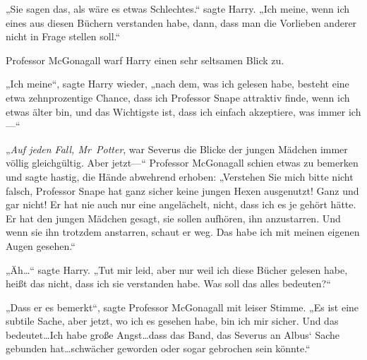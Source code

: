 „Sie sagen das, als wäre es etwas Schlechtes.“ sagte Harry. „Ich meine, wenn ich eines aus diesen Büchern verstanden habe, dann, dass man die Vorlieben anderer nicht in Frage stellen soll.“

Professor McGonagall warf Harry einen sehr seltsamen Blick zu.

„Ich meine“, sagte Harry wieder, „nach dem, was ich gelesen habe, besteht eine etwa zehnprozentige Chance, dass ich Professor Snape attraktiv finde, wenn ich etwas älter bin, und das Wichtigste ist, dass ich einfach akzeptiere, was immer ich—“

„\emph{Auf jeden Fall, Mr~Potter}, war Severus die Blicke der jungen Mädchen immer völlig gleichgültig. Aber jetzt—“ Professor McGonagall schien etwas zu bemerken und sagte hastig, die Hände abwehrend erhoben: „Verstehen Sie mich bitte nicht falsch, Professor Snape hat ganz sicher keine jungen Hexen ausgenutzt! Ganz und gar nicht! Er hat nie auch nur eine angelächelt, nicht, dass ich es je gehört hätte. Er hat den jungen Mädchen gesagt, sie sollen aufhören, ihn anzustarren. Und wenn sie ihn trotzdem anstarren, schaut er weg. Das habe ich mit meinen eigenen Augen gesehen.“

„Äh…“ sagte Harry. „Tut mir leid, aber nur weil ich diese Bücher gelesen habe, heißt das nicht, dass ich sie verstanden habe. Was soll das alles bedeuten?“

„Dass er es bemerkt“, sagte Professor McGonagall mit leiser Stimme. „Es ist eine subtile Sache, aber jetzt, wo ich es gesehen habe, bin ich mir sicher. Und das bedeutet…Ich habe große Angst…dass das Band, das Severus an Albus‘ Sache gebunden hat…schwächer geworden oder sogar gebrochen sein könnte.“

